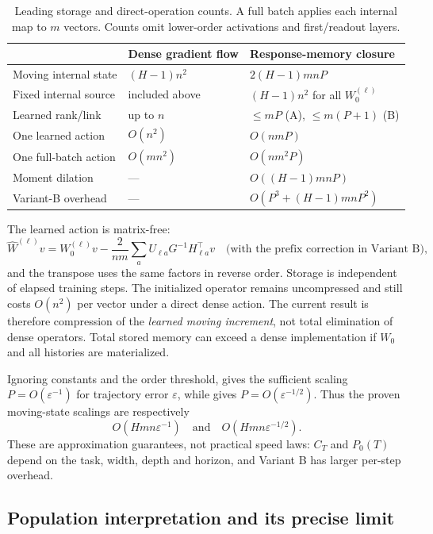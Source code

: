 \documentclass[11pt]{article}
\theoremstyle{definition}
\theoremstyle{remark}
\begin{document}
\begin{table}[t]
\centering
\caption{Leading storage and direct-operation counts.  A full batch applies
each internal map to $m$ vectors.  Counts omit lower-order activations and
first/readout layers.}
\label{tab:complexity}
\small
\begin{tabular}{lll}
\toprule
 & Dense gradient flow & Response-memory closure \\
\midrule
Moving internal state & $(H-1)n^2$ & $2(H-1)mnP$ \\
Fixed internal source & included above & $(H-1)n^2$ for all $W_0^{(\ell)}$ \\
Learned rank/link & up to $n$ & $\le mP$ (A), $\le m(P+1)$ (B) \\
One learned action & $O(n^2)$ & $O(nmP)$ \\
One full-batch action & $O(mn^2)$ & $O(nm^2P)$ \\
Moment dilation & --- & $O((H-1)mnP)$ \\
Variant-B overhead & --- & $O(P^3+(H-1)mnP^2)$ \\
\bottomrule
\end{tabular}
\end{table}

The learned action is matrix-free:
\[
 \widehat W^{(\ell)}v=W_0^{(\ell)}v-
 \frac{2}{nm}\sum_a U_{\ell a}G^{-1}H_{\ell a}^\top v
 \quad\text{(with the prefix correction in Variant B)},
\]
and the transpose uses the same factors in reverse order.  Storage is
independent of elapsed training steps.  The initialized operator remains
uncompressed and still costs $O(n^2)$ per vector under a direct dense action.
The current result is therefore compression of the \emph{learned moving
increment}, not total elimination of dense operators.  Total stored memory can
exceed a dense implementation if $W_0$ and all histories are materialized.

Ignoring constants and the order threshold,  gives the sufficient
scaling $P=O(\varepsilon^{-1})$ for trajectory error $\varepsilon$, while
 gives $P=O(\varepsilon^{-1/2})$.  Thus the proven moving-state
scalings are respectively
\[
 O(Hmn\varepsilon^{-1})\quad\text{and}\quad
 O(Hmn\varepsilon^{-1/2}).
\]
These are approximation guarantees, not practical speed laws: $C_T$ and
$P_0(T)$ depend on the task, width, depth and horizon, and Variant B has larger
per-step overhead.

\subsection{Population interpretation and its precise limit}
\end{document}
